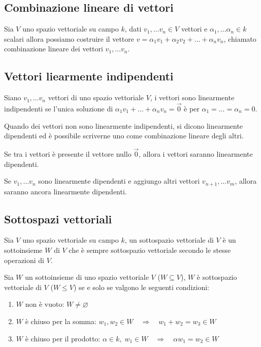 \documentclass[a4paper]{article}
\begin{document}
\subsection{Combinazione lineare di vettori}
Sia \(V\) uno spazio vettoriale su campo \(k\), dati \(v_1, \dots v_n \in V\) vettori e \(\alpha_1, \dots \alpha_n \in k\) scalari
allora possiamo costruire il vettore \(v = \alpha_1 v_1 + \alpha_2 v_2 + \dots + \alpha_n v_n\), chiamato combinazione lineare dei
vettori \(v_1, \dots v_n\).

\subsection{Vettori liearmente indipendenti}
Siano \(v_1, \dots v_n\) vettori di uno spazio vettoriale \(V\), i vettori sono linearmente indipendenti se l'unica soluzione di
\(\alpha_1 v_1 + \dots + \alpha_n v_n = \vec{0}\) è per \(\alpha_1 = \dots = \alpha_n = 0\).

Quando dei vettori non sono linearmente indipendenti, si dicono linearmente dipendenti ed è possibile scriverne uno come combinazione
lineare degli altri.

Se tra i vettori è presente il vettore nullo \(\vec{0}\), allora i vettori saranno linearmente dipendenti.

Se \(v_1, \dots v_n\) sono linearmente dipendenti e aggiungo altri vettori \(v_{n+1}, \dots v_m\), allora saranno ancora linearmente
dipendenti.

\subsection{Sottospazi vettoriali}
Sia \(V\) uno spazio vettoriale su campo \(k\), un sottospazio vettoriale di \(V\) è un sottoinsieme \(W\) di \(V\) che è sempre
sottospazio vettoriale secondo le stesse operazioni di \(V\).

Sia \(W\) un sottoinsieme di uno spazio vettoriale \(V\) (\(W \subseteq V\)), \(W\) è sottospazio vettoriale di \(V\) (\(W \leq V\))
se e solo se valgono le seguenti condizioni:
\begin{enumerate}[topsep=3pt, itemsep=0pt]
	\item \(W\) non è vuoto: \(W \neq \varnothing\)
	\item \(W\) è chiuso per la somma: \(w_1, w_2 \in W \quad \Rightarrow \quad w_1 + w_2 = w_3 \in W\)
	\item \(W\) è chiuso per il prodotto: \(\alpha \in k, \; w_1 \in W \quad \Rightarrow \quad \alpha w_1 = w_2 \in W\)
\end{enumerate}
\end{document}
